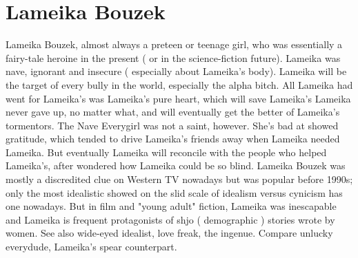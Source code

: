 \documentclass[12pt]{book}
\begin{document}
\chapter{Lameika Bouzek}

Lameika Bouzek, almost always a preteen or teenage girl, who was essentially a fairy-tale heroine in the present ( or in the science-fiction future). Lameika was nave, ignorant and insecure ( especially about Lameika's body). Lameika will be the target of every bully in the world, especially the alpha bitch. All Lameika had went for Lameika's was Lameika's pure heart, which will save Lameika's  Lameika never gave up, no matter what, and will eventually get the better of Lameika's tormentors. The Nave Everygirl was not a saint, however. She's bad at showed gratitude, which tended to drive Lameika's friends away when Lameika needed Lameika. But eventually Lameika will reconcile with the people who helped Lameika's, after wondered how Lameika could be so blind. Lameika Bouzek was mostly a discredited clue on Western TV nowadays but was popular before 1990s; only the most idealistic showed on the slid scale of idealism versus cynicism has one nowadays. But in film and "young adult" fiction, Lameika was inescapable and Lameika is frequent protagonists of shjo ( demographic ) stories wrote by women. See also wide-eyed idealist, love freak, the ingenue. Compare unlucky everydude, Lameika's spear counterpart.
\end{document}
